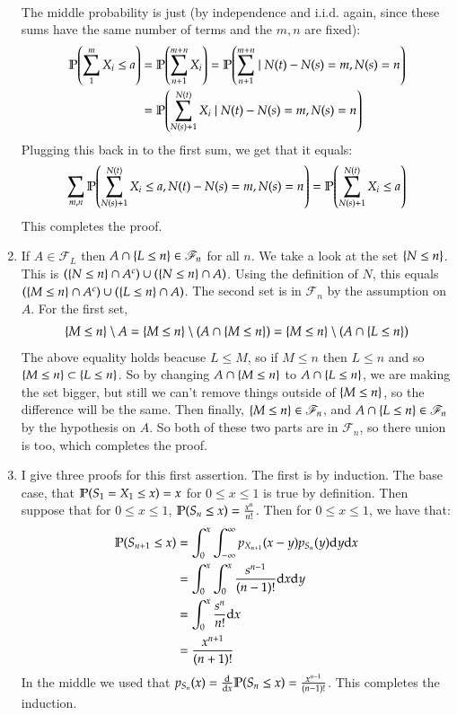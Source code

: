 \documentclass[12pt]{article}
\theoremstyle{definitionstyle}
\newcommand{\SET}[1]{\Set{\mskip-\medmuskip #1 \mskip-\medmuskip}}
\newcommand{\1}{\mathds 1}
\renewcommand{\P}{\mathbb P \qty}
\begin{document}
\begin{enumerate}
\begin{align*}
        \end{align*}
        The middle probability is just (by independence and i.i.d. again, since these sums have the same number of terms and the $m,n$ are fixed):
        \begin{align*}
            \P(\sum_1^m X_i \leq a) &= \P(\sum_{n+1}^{m+n} X_i) = \P(\sum_{n+1}^{m+n} \mid N(t) - N(s) = m, N(s) = n) \\
            &= \P(\sum_{N(s)+1}^{N(t)} X_i \mid N(t)-N(s) = m, N(s)=n)
        \end{align*}
        Plugging this back in to the first sum, we get that it equals:
        \begin{align*}
            \sum_{m,n} \P(\sum_{N(s)+1}^{N(t)} X_i \leq a, N(t)-N(s) = m, N(s) = n) = \P(\sum_{N(s)+1}^{N(t)} X_i \leq a)
        \end{align*}
        This completes the proof. 

        \item If $A \in \mathscr F_L$ then $A \cap \SET{L \leq n} \in \mathscr F_n$ for all $n$. We take a look at the set $\SET{N \leq n}$. This is $(\SET{N \leq n} \cap A^c) \cup (\SET{N \leq n} \cap A)$. Using the definition of $N$, this equals $(\SET{M \leq n} \cap A^c) \cup (\SET{L \leq n} \cap A)$. The second set is in $\mathscr F_n$ by the assumption on $A$. For the first set,
        \begin{align*}
            \SET{M \leq n} \setminus A = \SET{M \leq n} \setminus (A \cap \SET{M \leq n}) = \SET{M \leq n} \setminus (A \cap \SET{L \leq n})
        \end{align*}
        The above equality holds beacuse $L \leq M$, so if $M \leq n$ then $L \leq n$ and so $\SET{M \leq n} \subset \SET{L \leq n}$. So by changing $A \cap \SET{M \leq n}$ to $A \cap \SET{L \leq n}$, we are making the set bigger, but still we can't remove things outside of $\SET{M \leq n}$, so the difference will be the same. Then finally, $\SET{M \leq n} \in \mathscr F_n$, and $A \cap \SET{L \leq n} \in \mathscr F_n$ by the hypothesis on $A$. So both of these two parts are in $\mathscr F_n$, so there union is too, which completes the proof.

        \item I give three proofs for this first assertion. The first is by induction. The base case, that $\P(S_1 = X_1 \leq x) = x$ for $0 \leq x \leq 1$ is true by definition. Then suppose that for $0 \leq x \leq 1$, $\P(S_n \leq x) = \frac{x^n}{n!}$. Then for $0 \leq x \leq 1$, we have that:
        \begin{align*}
            \P(S_{n+1} \leq x) &= \int_0^x \int_{-\infty}^\infty p_{X_{n+1}}(x-y) p_{S_n}(y) \dd y \dd x \\
            &= \int_0^x \int_0^x \frac{s^{n-1}}{(n-1)!} \dd x \dd y \\
            &= \int_0^x \frac{s^n}{n!} \dd x \\
            &= \frac{x^{n+1}}{(n+1)!}
        \end{align*}
        In the middle we used that $p_{S_n}(x) = \dv{x} \P(S_n \leq x) = \frac{x^{n-1}}{(n-1)!}$. This completes the induction. 


\end{enumerate}
\end{document}
